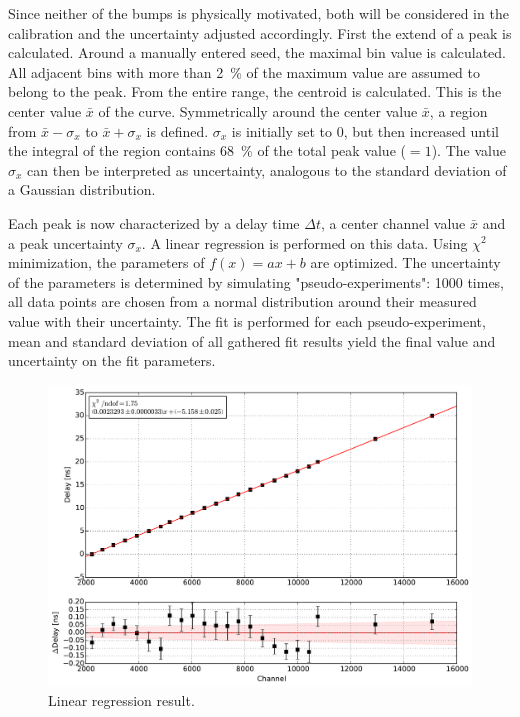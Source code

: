 \documentclass[
	paper=A4,
	parskip=full,
	chapterprefix=true,
	11pt,
	headings=normal,
	bibliography=totoc,
	listof=totoc,
	titlepage=on,
]{scrreprt}
\begin{document}
Since neither of the bumps is physically motivated, both will be considered in the calibration and the uncertainty adjusted accordingly.
First the extend of a peak is calculated. Around a manually entered seed, the maximal bin value is calculated. All adjacent bins with more than \SI{2}{\percent} of the maximum value are assumed to belong to the peak. From the entire range, the centroid is calculated. This is the center value $\bar{x}$ of the curve. Symmetrically around the center value $\bar{x}$, a region from $\bar{x}-\sigma_x$ to $\bar{x}+\sigma_x$ is defined. $\sigma_x$ is initially set to \num{0}, but then increased until the integral of the region contains \SI{68}{\percent} of the total peak value ($ = \num{1}$). The value $\sigma_x$ can then be interpreted as uncertainty, analogous to the standard deviation of a Gaussian distribution.

Each peak is now characterized by a delay time $\Delta t$, a center channel value $\bar{x}$ and a peak uncertainty $\sigma_x$.
A linear regression is performed on this data. Using $\chi^2$ minimization, the parameters of $f(x) = a x + b$ are optimized. 
The uncertainty of the parameters is determined by simulating "pseudo-experiments": \num{1000} times, all data points are chosen from a normal distribution around their measured value with their uncertainty. The fit is performed for each pseudo-experiment, mean and standard deviation of all gathered fit results yield the final value and uncertainty on the fit parameters.

\begin{figure}
	\centering
	\includegraphics{calibration}
	\caption{Linear regression result.}
	\label{fig:calibration_linreg}
\end{figure}
\end{document}
